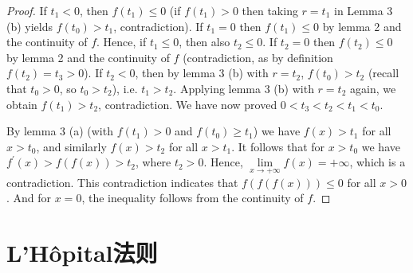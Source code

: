 \begin{1b}
\begin{enumerate}
\begin{proof}
If $t_1<0$, then $f(t_1) \leqslant 0$ (if $f(t_1)>0$ 
then taking $r=t_1$ in Lemma 3 (b) yields $f(t_0)>t_1$, contradiction). 
If $t_1=0$ then $f(t_1) \leqslant 0$ by lemma 2 and the continuity of $f$. 
Hence, if $t_1 \leqslant 0$, then also $t_2 \leqslant 0$. 
If $t_2=0$ then $f(t_2) \leqslant 0$ by lemma 2 and the continuity of $f$ 
(contradiction, as by definition $f(t_2)=t_3>0$). 
If $t_2<0$, then by lemma 3 (b) with $r=t_2$, $f(t_0)>t_2$ 
(recall that $t_0>0$, so $t_0>t_2$), i.e. $t_1>t_2$. 
Applying lemma 3 (b) with $r=t_2$ again, we obtain $f(t_1)>t_2$, contradiction. 
We have now proved $0<t_3<t_2<t_1<t_0$.

By lemma 3 (a) (with $f(t_1)>0$ and $f(t_0) \geqslant t_1$) 
we have $f(x)>t_1$ for all $x>t_0$, and similarly $f(x)>t_2$ for all $x>t_1$. 
It follows that for $x>t_0$ we have $f^{\prime}(x)>f(f(x))>t_2$, where $t_2>0$. 
Hence, $\lim\limits_{x \rightarrow+\infty} f(x)=+\infty$, which is a contradiction. 
This contradiction indicates that $f(f(f(x))) \leqslant 0$ for all $x>0$. 
And for $x=0$, the inequality follows from the continuity of $f$.
\end{proof}
\end{enumerate}
\end{1b}

\section{L'H\^{o}pital法则}
